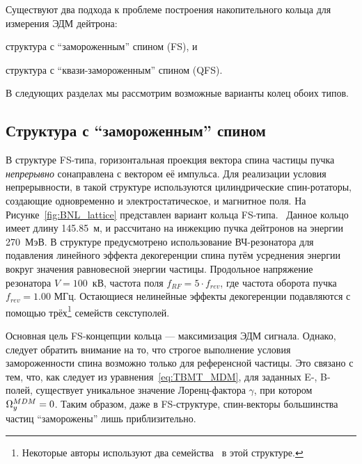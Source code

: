 
Существуют два подхода к проблеме построения накопительного кольца для измерения ЭДМ дейтрона: 
\begin{enumerate*}
	\item структура с ``замороженным'' спином (FS), и 
	\item структура с ``квази-замороженным'' спином (QFS).
\end{enumerate*}

В следующих разделах мы рассмотрим возможные варианты колец обоих типов.

\subsection{Структура с ``замороженным'' спином} \label{chpt2:lattice:FS_BNL}
В структуре FS-типа, горизонтальная проекция вектора спина частицы пучка \emph{непрерывно} сонаправлена с вектором её импульса. Для реализации условия непрерывности, в такой структуре используются цилиндрические спин-ротаторы, создающие одновременно и электростатическое, и магнитное поля. На Рисунке~\ref{fig:BNL_lattice} представлен вариант кольца FS-типа.~\cite{Senichev:Lattices} Данное кольцо имеет длину 145.85~м, и рассчитано на инжекцию пучка дейтронов на энергии 270~МэВ. В структуре предусмотрено использование ВЧ-резонатора для подавления линейного эффекта декогеренции спина путём усреднения энергии вокруг значения равновесной энергии частицы. Продольное напряжение резонатора ${V = 100}$~кВ, частота поля ${f_{RF} = 5\cdot f_{rev}}$, где частота оборота пучка ${f_{rev} = 1.00}$ МГц. Остающиеся нелинейные эффекты декогеренции подавляются с помощью трёх\footnote{Некоторые авторы используют
два семейства~\cite{Eremey:Thesis} в этой структуре.} семейств секступолей.

Основная цель FS-концепции кольца --- максимизация ЭДМ сигнала. Однако, следует обратить внимание на то, что строгое выполнение условия замороженности спина возможно только для референсной частицы. Это связано с тем, что, как следует из уравнения~\eqref{eq:TBMT_MDM}, для заданных E-, B-полей, существует уникальное значение Лоренц-фактора $\gamma$, при котором ${\Omega_y^{MDM} = 0}$. Таким образом, даже в FS-структуре, спин-векторы большинства частиц ``заморожены'' лишь приблизительно.

